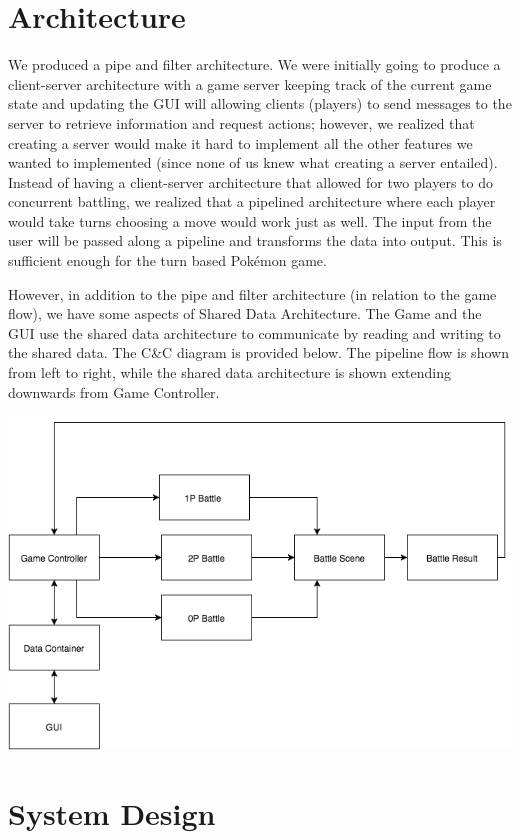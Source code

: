 \documentclass{scrreprt}
\begin{document}
\section{Architecture}
	We produced a pipe and filter architecture. We were initially going to produce a client-server architecture with a game server keeping track of the current game state and updating the GUI will allowing clients (players) to send messages to the server to retrieve information and request actions; however, we realized that creating a server would make it hard to implement all the other features we wanted to implemented (since none of us knew what creating a server entailed). Instead of having a client-server architecture that allowed for two players to do concurrent battling, we realized that a pipelined architecture where each player would take turns choosing a move would work just as well. The input from the user will be passed along a pipeline and transforms the data into output. This is sufficient enough for the turn based Pok\'emon game. 
	
	However, in addition to the pipe and filter architecture (in relation to the game flow), we have some aspects of Shared Data Architecture. The Game and the GUI use the shared data architecture to communicate by reading and writing to the shared data. The C\&C diagram is provided below. The pipeline flow is shown from left to right, while the shared data architecture is shown extending downwards from Game Controller. 
	
	\includegraphics[scale=0.75]{C&C.png}

\section{System Design}
\end{document}
